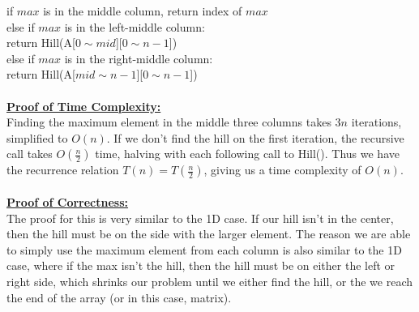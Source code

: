 \documentclass[10pt, letterpaper]{report}
\newcommand\tab[1][1cm]{\hspace*{#1}}
\begin{document}
if $max$ is in the middle column, return index of $max$\\
else if $max$ is in the left-middle column:\\
\tab return Hill(A[$0 \sim mid$][$0 \sim n-1$])\\
else if $max$ is in the right-middle column:\\
\tab return Hill(A[$mid \sim n - 1$][$0 \sim n-1$])\\
\\
\textbf{\underline{Proof of Time Complexity:}}\\
Finding the maximum element in the middle three columns takes $3n$ iterations, simplified to $O(n)$. If we don't find the hill on the first iteration, the recursive call takes $O(\frac{n}{2})$ time, halving with each following call to Hill(). Thus we have the recurrence relation $T(n) = T(\frac{n}{2})$, giving us a time complexity of $O(n)$.\\
\\
\textbf{\underline{Proof of Correctness:}}\\
The proof for this is very similar to the 1D case. If our hill isn't in the center, then the hill must be on the side with the larger element. The reason we are able to simply use the maximum element from each column is also similar to the 1D case, where if the max isn't the hill, then the hill must be on either the left or right side, which shrinks our problem until we either find the hill, or the we reach the end of the array (or in this case, matrix).
\end{document}

